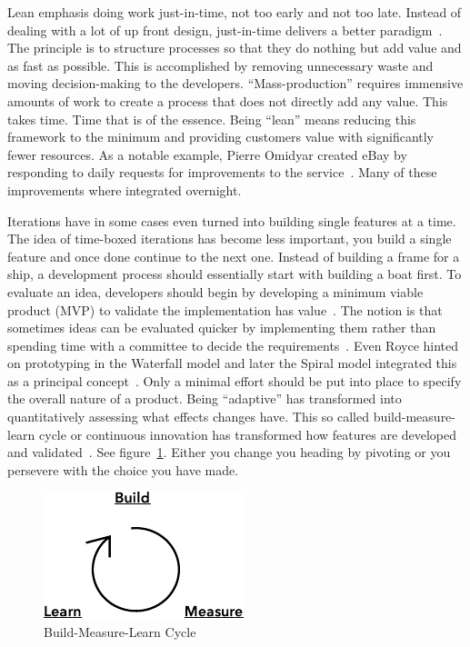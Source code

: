 \documentclass[english]{tktltiki2}
\begin{document}
Lean emphasis doing work just-in-time, not too early and not too late. Instead of dealing with a lot of up front design, just-in-time delivers a better paradigm~\cite{Pop02}. The principle is to structure processes so that they do nothing but add value and as fast as possible. This is accomplished by removing unnecessary waste and moving decision-making to the developers. “Mass-production” requires immensive amounts of work to create a process that does not directly add any value. This takes time. Time that is of the essence. Being “lean” means reducing this framework to the minimum and providing customers value with significantly fewer resources. As a notable example, Pierre Omidyar created eBay by responding to daily requests for improvements to the service~\cite{Pop02}. Many of these improvements where integrated overnight.

Iterations have in some cases even turned into building single features at a time. The idea of time-boxed iterations has become less important, you build a single feature and once done continue to the next one. Instead of building a frame for a ship, a development process should essentially start with building a boat first. To evaluate an idea, developers should begin by developing a minimum viable product (MVP) to validate the implementation has value~\cite{Rie11}. The notion is that sometimes ideas can be evaluated quicker by implementing them rather than spending time with a committee to decide the requirements~\cite{Pop02}. Even Royce hinted on prototyping in the Waterfall model and later the Spiral model integrated this as a principal concept~\cite{Roy70, Boe88}. Only a minimal effort should be put into place to specify the overall nature of a product. Being “adaptive” has transformed into quantitatively assessing what effects changes have. This so called build-measure-learn cycle or continuous innovation has transformed how features are developed and validated~\cite{Rie11}. See figure~\ref{figure:build-measure-learn}. Either you change you heading by pivoting or you persevere with the choice you have made.

\begin{figure}[h!]

    \vspace{1cm}
    \centering

    \includegraphics{figures/build-measure-learn}

    \caption{Build-Measure-Learn Cycle}
    \label{figure:build-measure-learn}

    \vspace{1cm}

\end{figure}
\end{document}
